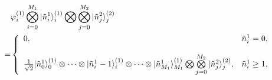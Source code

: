 \documentclass[10pt,a4paper]{amsart}
\begin{document}
	\begin{align}\label{right-ym}
		&\varphi_i^{(1)} \bigotimes_{i=0}^{M_{1}}|\tilde{n}_{i}^{1} \rangle_{i}^{(1)}\bigotimes\bigotimes_{j=0}^{M_{2}}|\tilde{n}_{j}^{2}\rangle_{j}^{(2)}   \notag\\
		=&\left\{
		\begin{array}
			{ll}0, & \tilde{n}_{i}^{1}=0, \\
			\\
			\frac{1}{\sqrt{2}}|\tilde{n}_{0}^{1} \rangle_0^{(1)}\otimes\cdots\otimes|\tilde{n}_{i}^{1}-1\rangle_i^{(1)}\otimes\cdots\otimes|\tilde{n}_{M_1}^{1}\rangle_{M_1}^{(1)}\bigotimes\bigotimes\limits_{j=0}^{M_{2}}|\tilde{n}_{j}^{2}\rangle_{j}^{(2)}, & \tilde{n}_{i}^{1}\geq1,
		\end{array}\right.
	\end{align}	
\end{document}
